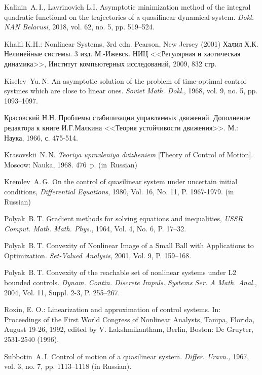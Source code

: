\documentclass[../main.tex]{subfiles}
\begin{document}
\begin{thebibliography}{99}
Kalinin~A.\,I., Lavrinovich L.I. Asymptotic minimization method of the integral quadratic functional on
the trajectories of a quasilinear dynamical system. \emph{Dokl. NAN Belarusi}, 2018, vol. 62, no. 5, pp. 519–524.

Khalil K.H.: Nonlinear Systems, 3rd edn. Pearson, New Jersey (2001)
Халил Х.К. Нелинейные системы. 3 изд. М.-Ижевск. НИЦ <<Регулярная и хаотическая динамика>>, Институт компьютерных исследований, 2009, 832 стр.

Kiselev~Yu.\,N. An asymptotic solution of the problem of time-optimal control systmes which are close to
linear ones. \emph{Soviet Math. Dokl.}, 1968, vol. 9, no. 5, pp. 1093–1097.

Красовский Н.Н. Проблемы стабилизации управляемых движений. Дополнение редактора к книге И.Г.Малкина <<Теория устойчивости  движения>>. М.: Наука, 1966, с. 475-514.

{Krasovskii~N.\,N.} \emph{Teoriya upravleniya dvizheniem} [Theory of Control of Motion]. Moscow: Nauka, 1968. 476~p. (in~Russian)

Kremlev~A.\,G. On the control of quasilinear system under uncertain initial conditions, \emph{Differential Equations}, 1980, Vol. 16, No. 11, P. 1967-1979. (in Russian)

Polyak~B.\,T. Gradient methods for solving equations and inequalities, \emph{USSR Comput. Math. Math.
	Phys.}, 1964, Vol. 4, No. 6, P. 17–32.

Polyak~B.\,T. Convexity of Nonlinear Image of a Small Ball with Applications to Optimization. \emph{Set-Valued Analysis}, 2001, Vol. 9, P. 159–168.

Polyak~B.\,T. Convexity of the reachable set of nonlinear systems under L2 bounded controls. \emph{Dynam. Contin. Discrete Impuls. Systems Ser. A Math. Anal.}, 2004, Vol. 11, Suppl. 2-3,  P. 255–267.

Roxin, E. O.: Linearization and approximation of control systems. In: Proceedings of the First World Congress of Nonlinear Analysts, Tampa, Florida, August 19-26, 1992, edited by V. Lakshmikantham, Berlin, Boston: De Gruyter, 2531-2540 (1996). 

Subbotin~A.\,I. Control of motion of a quasilinear system. \emph{Differ. Uravn.,} 1967, vol. 3, no. 7, pp. 1113–1118
(in Russian).


\end{thebibliography}
\end{document}
